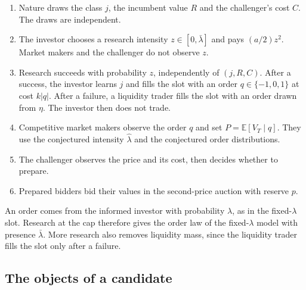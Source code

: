 \documentclass[12pt]{article}
\theoremstyle{definition}
\theoremstyle{remark}
\newcommand{\E}{\mathbb E}
\newcommand{\lh}{\hat\lambda}
\newcommand{\lb}{\bar\lambda}
\begin{document}
\begin{enumerate}[nosep]
\item Nature draws the class $j$, the incumbent value $R$ and the challenger's cost $C$. The draws are independent.
\item The investor chooses a research intensity $z\in[0,\lb]$ and pays $(a/2)z^2$. Market makers and the challenger do not observe $z$.
\item Research succeeds with probability $z$, independently of $(j,R,C)$. After a success, the investor learns $j$
  and fills the slot with an order $q\in\{-1,0,1\}$ at cost $k|q|$. After a failure, a liquidity trader fills the
  slot with an order drawn from $\eta$. The investor then does not trade.
\item Competitive market makers observe the order $q$ and set $P=\E[V_T\mid q]$. They use the conjectured
  intensity $\lh$ and the conjectured order distributions.
\item The challenger observes the price and its cost, then decides whether to prepare.
\item Prepared bidders bid their values in the second-price auction with reserve $p$.
\end{enumerate}
An order comes from the informed investor with probability $\lambda$, as in the fixed-$\lambda$ slot. Research at
the cap therefore gives the order law of the fixed-$\lambda$ model with presence $\lb$. More research also removes
liquidity mass, since the liquidity trader fills the slot only after a failure.

\subsection{The objects of a candidate}
\end{document}
